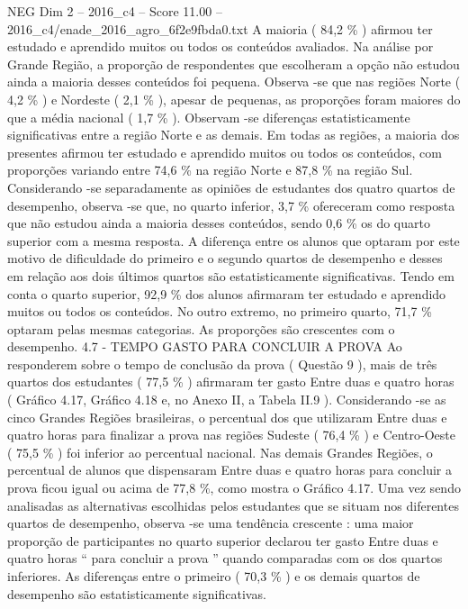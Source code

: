 \begin{textsample}{NEG Dim 2 – 2016\_c4 – Score 11.00 – 2016\_c4/enade\_2016\_agro\_6f2e9fbda0.txt}
A maioria ( 84,2 \% ) afirmou ter estudado e aprendido muitos ou todos os conteúdos avaliados.
Na análise por Grande Região, a proporção de respondentes que escolheram a opção não estudou ainda a maioria desses conteúdos foi pequena.
Observa -se que nas regiões Norte ( 4,2 \% ) e Nordeste ( 2,1 \% ), apesar de pequenas, as proporções foram maiores do que a média nacional ( 1,7 \% ).
Observam -se diferenças estatisticamente significativas entre a região Norte e as demais.
Em todas as regiões, a maioria dos presentes afirmou ter estudado e aprendido muitos ou todos os conteúdos, com proporções variando entre 74,6 \% na região Norte e 87,8 \% na região Sul.
Considerando -se separadamente as opiniões de estudantes dos quatro quartos de desempenho, observa -se que, no quarto inferior, 3,7 \% ofereceram como resposta que não estudou ainda a maioria desses conteúdos, sendo 0,6 \% os do quarto superior com a mesma resposta.
A diferença entre os alunos que optaram por este motivo de dificuldade do primeiro e o segundo quartos de desempenho e desses em relação aos dois últimos quartos são estatisticamente significativas.
Tendo em conta o quarto superior, 92,9 \% dos alunos afirmaram ter estudado e aprendido muitos ou todos os conteúdos.
No outro extremo, no primeiro quarto, 71,7 \% optaram pelas mesmas categorias.
As proporções são crescentes com o desempenho. 4.7 - TEMPO GASTO PARA CONCLUIR A PROVA Ao responderem sobre o tempo de conclusão da prova ( Questão 9 ), mais de três quartos dos estudantes ( 77,5 \% ) afirmaram ter gasto Entre duas e quatro horas ( Gráfico 4.17, Gráfico 4.18 e, no Anexo II, a Tabela II.9 ).
Considerando -se as cinco Grandes Regiões brasileiras, o percentual dos que utilizaram Entre duas e quatro horas para finalizar a prova nas regiões Sudeste ( 76,4 \% ) e Centro-Oeste ( 75,5 \% ) foi inferior ao percentual nacional.
Nas demais Grandes Regiões, o percentual de alunos que dispensaram Entre duas e quatro horas para concluir a prova ficou igual ou acima de 77,8 \%, como mostra o Gráfico 4.17.
Uma vez sendo analisadas as alternativas escolhidas pelos estudantes que se situam nos diferentes quartos de desempenho, observa -se uma tendência crescente : uma maior proporção de participantes no quarto superior declarou ter gasto Entre duas e quatro horas “ para concluir a prova ” quando comparadas com os dos quartos inferiores.
As diferenças entre o primeiro ( 70,3 \% ) e os demais quartos de desempenho são estatisticamente significativas.

\end{textsample}

